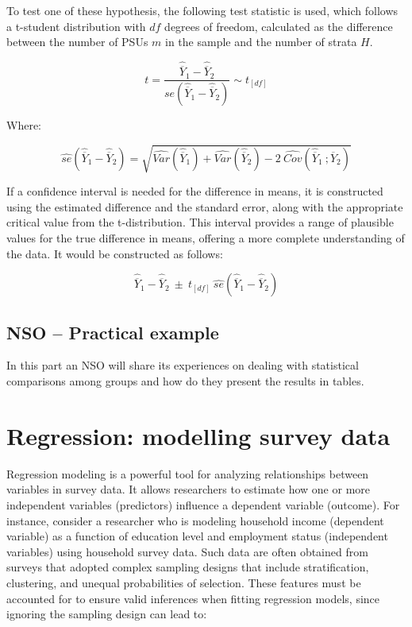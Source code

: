 \documentclass[
  12pt,
]{book}
\begin{document}
To test one of these hypothesis, the following test statistic is used, which follows a t-student distribution with \(df\) degrees of freedom, calculated as the difference between the number of PSUs \(m\) in the sample and the number of strata \(H\).

\[
t = \frac{\widehat{\overline{Y}}_{1} - \widehat{\overline{Y}}_{2}} {se\left(\widehat{\overline{Y}}_{1} - \widehat{\overline{Y}}_{2}\right)} \sim t_{[df]}
\]

Where:

\[
\widehat{se} \left( \widehat{\overline{Y}}_{1} - \widehat{\overline{Y}}_{2} \right) = \sqrt{\widehat{Var}\left(\widehat{\overline{Y}}_{1}\right) + \widehat{Var}\left(\widehat{\overline{Y}}_{2}\right) - 2 \  \widehat{Cov}\left(\widehat{\overline{Y}}_{1} \ ; \widehat{\overline{Y}}_{2} \right)}
\]

If a confidence interval is needed for the difference in means, it is constructed using the estimated difference and the standard error, along with the appropriate critical value from the t-distribution. This interval provides a range of plausible values for the true difference in means, offering a more complete understanding of the data. It would be constructed as follows:

\[
\widehat{\overline{Y}}_{1} - \widehat{\overline{Y}}_{2} \ \pm \ t_{[df]} \ \widehat{se}\left( \widehat{\overline{Y}}_{1} - \widehat{\overline{Y}}_{2} \right)
\]

\hypertarget{nso-practical-example-1}{%
\section{NSO -- Practical example}\label{nso-practical-example-1}}

In this part an NSO will share its experiences on dealing with statistical comparisons among groups and how do they present the results in tables.

\hypertarget{regression-modelling-survey-data}{%
\chapter{Regression: modelling survey data}\label{regression-modelling-survey-data}}

Regression modeling is a powerful tool for analyzing relationships between variables in survey data. It allows researchers to estimate how one or more independent variables (predictors) influence a dependent variable (outcome). For instance, consider a researcher who is modeling household income (dependent variable) as a function of education level and employment status (independent variables) using household survey data. Such data are often obtained from surveys that adopted complex sampling designs that include stratification, clustering, and unequal probabilities of selection. These features must be accounted for to ensure valid inferences when fitting regression models, since ignoring the sampling design can lead to:
\end{document}
